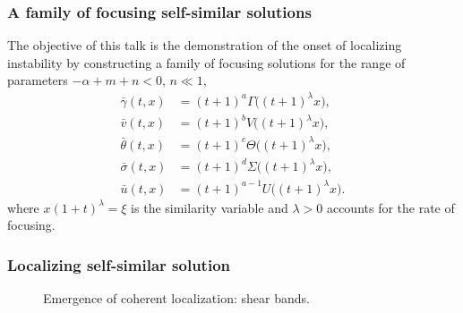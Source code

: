 \documentclass{beamer}
\def\red{\color{red}}
\def\blue{\color{blue}}
\def\bg{{\bar{\gamma}}}
\def\bv{{\bar{v}}}
\def\bth{{\bar{\theta}}}
\def\bs{{\bar{\sigma}}}
\def\bu{{\bar{u}}}
\begin{document}
\begin{frame}
 \frametitle{A family of focusing self-similar solutions}
   {The objective of this talk} is the demonstration of the onset of localizing instability by constructing {\blue a family of {\red focusing} solutions} for the range of parameters $-\alpha+m+n<0$, $n\ll1$,
\begin{equation} \label{intro-sols}
\begin{aligned}
 \bg(t,x) &= (t+1)^a\Gamma\big((t+1)^\lambda x\big), \\
 \bv(t,x) &= (t+1)^b V\big((t+1)^\lambda x\big), \\
 \bth(t,x) &= (t+1)^c\Theta\big((t+1)^\lambda x\big),\\
 \bs(t,x) &= (t+1)^d\Sigma\big((t+1)^\lambda x\big), \\
 \bu(t,x) &= (t+1)^{a-1}U\big((t+1)^\lambda x\big).
\end{aligned}
\end{equation}
where $x(1 + t)^{\lambda}=\xi$ is the similarity variable and $\lambda>0$ accounts for the rate of focusing.
\end{frame}




\begin{frame}
 \frametitle{Localizing self-similar solution}
   \setcounter{subfigure}{0}
   \begin{figure}
	\quad \quad
   \caption{Emergence of coherent localization: shear bands.}
  \end{figure}
\end{frame}
\end{document}
